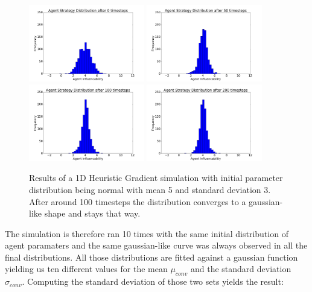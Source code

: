 \documentclass[11pt]{article}
\begin{document}
\begin{figure}
  \centering
  \quad
  \includegraphics[width=0.45\textwidth]{figures/convergence_example_1.png}
  \includegraphics[width=0.45\textwidth]{figures/convergence_example_2.png}
  \includegraphics[width=0.45\textwidth]{figures/convergence_example_3.png}
  \includegraphics[width=0.45\textwidth]{figures/convergence_example_4.png}
  \caption[Convergence Example]{Results of a 1D Heuristic Gradient simulation with initial parameter distribution being normal with mean 5 and standard deviation 3. After around 100 timesteps the distribution converges to a gaussian-like shape and stays that way.}
  \label{fig:convergenceexample}
\end{figure}
The simulation is therefore ran 10 times with the same initial distribution of agent paramaters and the same gaussian-like curve was always observed in all the final distributions. All those distributions are fitted against a gaussian function yielding us ten different values for the mean $\mu_{conv}$ and the standard deviation $\sigma_{conv}$. Computing the standard deviation of those two sets yields the result:
\end{document}
